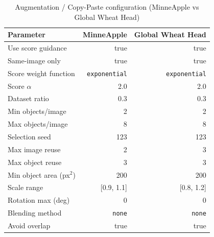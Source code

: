 \documentclass[11pt, a4paper]{article}
\begin{document}
\begin{table}[htbp]
\centering
\small
\setlength{\tabcolsep}{4pt}
\caption{Augmentation / Copy-Paste configuration (MinneApple vs Global Wheat Head)}
\label{tab:augmentation_config}
\begin{tabular}{lrr}
\toprule
Parameter & MinneApple & Global Wheat Head \\
\midrule
Use score guidance & true & true \\
Same-image only & true & true \\
Score weight function & \texttt{exponential} & \texttt{exponential} \\
Score $\alpha$ & 2.0 & 2.0 \\
Dataset ratio & 0.3 & 0.3 \\
Min objects/image & 2 & 2 \\
Max objects/image & 8 & 8 \\
Selection seed & 123 & 123 \\
Max image reuse & 2 & 3 \\
Max object reuse & 3 & 3 \\
Min object area (px$^2$) & 200 & 200 \\
Scale range & [0.9, 1.1] & [0.8, 1.2] \\
Rotation max (deg) & 0 & 0 \\
Blending method & \texttt{none} & \texttt{none} \\
Avoid overlap & true & true \\
\bottomrule
\end{tabular}
\end{table}
\end{document}
